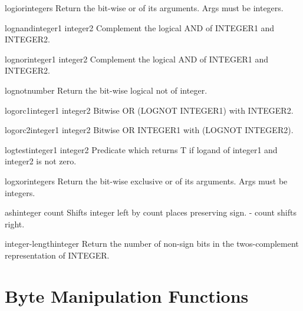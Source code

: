 \documentclass[10pt,english]{book}
\begin{document}
\begin{function}{logior}{\rest integers}
  Return the bit-wise or of its arguments. Args must be integers.
\end{function}

\begin{function}{lognand}{integer1 integer2}
  Complement the logical AND of INTEGER1 and INTEGER2.
\end{function}

\begin{function}{lognor}{integer1 integer2}
  Complement the logical AND of INTEGER1 and INTEGER2.
\end{function}

\begin{function}{lognot}{number}
  Return the bit-wise logical not of integer.
\end{function}

\begin{function}{logorc1}{integer1 integer2}
  Bitwise OR (LOGNOT INTEGER1) with INTEGER2.
\end{function}

\begin{function}{logorc2}{integer1 integer2}
  Bitwise OR INTEGER1 with (LOGNOT INTEGER2).
\end{function}

\begin{function}{logtest}{integer1 integer2}
  Predicate which returns T if logand of integer1 and integer2 is not zero.
\end{function}

\begin{function}{logxor}{\rest integers}
  Return the bit-wise exclusive or of its arguments. Args must be integers.
\end{function}

\begin{function}{ash}{integer count}
  Shifts integer left by count places preserving sign. - count shifts right.
\end{function}

\begin{function}{integer-length}{integer}
  Return the number of non-sign bits in the twos-complement representation
  of INTEGER.
\end{function}

\section{Byte Manipulation Functions}
\label{sec:byte-manip-funct}
\end{document}
